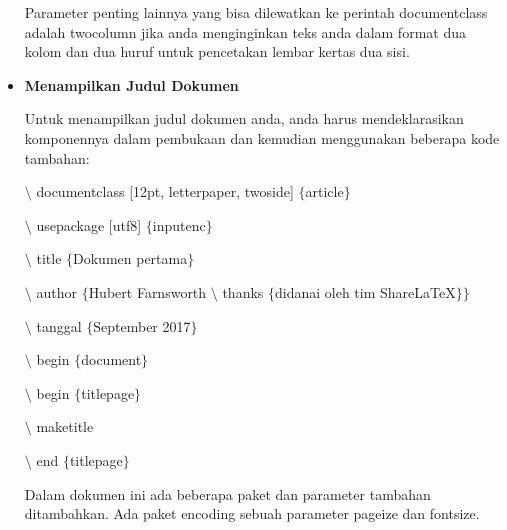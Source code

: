 \begin{itemize}
\hspace*{0.5in}Parameter penting lainnya yang bisa dilewatkan ke perintah documentclass adalah twocolumn jika anda menginginkan teks anda dalam format dua kolom dan dua huruf untuk pencetakan lembar kertas dua sisi.\par

\vspace{10pt}
	\item {\fontsize{14pt}{14pt}\selectfont \textbf{Menampilkan Judul Dokumen}}\par

Untuk menampilkan judul dokumen anda, anda harus mendeklarasikan komponennya dalam pembukaan dan kemudian menggunakan beberapa kode tambahan:\par

\hspace*{0.5in}$\setminus$ documentclass [12pt, letterpaper, twoside] $ \{ $article$ \} $\par

\hspace*{0.5in}$\setminus$ usepackage [utf8] $ \{ $inputenc$ \} $\par

\hspace*{0.5in}$\setminus$ title $ \{ $Dokumen pertama$ \} $\par

\hspace*{0.5in}$\setminus$ author $ \{ $Hubert Farnsworth $\setminus$ thanks $ \{ $didanai oleh tim ShareLaTeX$ \} $$ \} $\par

\hspace*{0.5in}$\setminus$ tanggal $ \{ $September 2017$ \} $\par

\hspace*{0.5in}$\setminus$ begin $ \{ $document$ \} $\par

\hspace*{0.5in}$\setminus$ begin $ \{ $titlepage$ \} $\par

\hspace*{0.5in}$\setminus$ maketitle\par

\hspace*{0.5in}$\setminus$ end $ \{ $titlepage$ \} $\par

\hspace*{0.5in}Dalam dokumen ini ada beberapa paket dan parameter tambahan ditambahkan. Ada paket \hspace*{0.5in}encoding sebuah parameter pageize dan fontsize.\par


\end{itemize}
